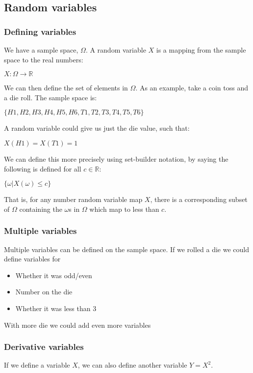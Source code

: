 
\subsection{Random variables}

\subsubsection{Defining variables}

We have a sample space, \(\Omega \). A random variable \(X\) is a mapping from the sample space to the real numbers:

\(X: \Omega \rightarrow \mathbb{R}\)

We can then define the set of elements in \(\Omega \). As an example, take a coin toss and a die roll. The sample space is:

\(\{H1,H2,H3,H4,H5,H6,T1,T2,T3,T4,T5,T6\}\)

A random variable could give us just the die value, such that:

\(X(H1)=X(T1)=1\)

We can define this more precisely using set-builder notation, by saying the following is defined for all	 \(c\in \mathbb{R}\):

\(\{\omega |X(\omega )\le c\}\)

That is, for any number random variable map \(X\), there is a corresponding subset of \(\Omega \) containing the \(\omega \)s in \(\Omega \) which map to less than \(c\).

\subsubsection{Multiple variables}

Multiple variables can be defined on the sample space. If we rolled a die we could define variables for

\begin{itemize}
\item Whether it was odd/even
\item Number on the die
\item Whether it was less than 3
\end{itemize}

With more die we could add even more variables

\subsubsection{Derivative variables}

If we define a variable \(X\), we can also define another variable \(Y=X^2\).

